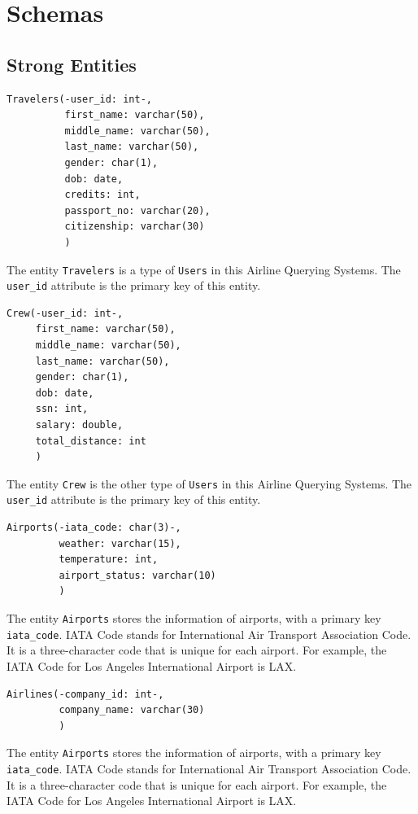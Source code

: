 \documentclass{article}
\begin{document}
	\section{Schemas}
	
	\subsection{Strong Entities}
	\begin{lstlisting}[keepspaces=true]
Travelers(-user_id: int-,
          first_name: varchar(50),
          middle_name: varchar(50),
          last_name: varchar(50),
          gender: char(1),
          dob: date,
          credits: int,
          passport_no: varchar(20), 
          citizenship: varchar(30)
          )
	\end{lstlisting}    
	The entity \texttt{Travelers} is a type of \texttt{Users} in this Airline Querying Systems. The 
	\texttt{user\_id} attribute is the primary key of this entity.
	
	\begin{lstlisting}[keepspaces=true]
Crew(-user_id: int-,
     first_name: varchar(50),
     middle_name: varchar(50),
     last_name: varchar(50),
     gender: char(1),
     dob: date,
     ssn: int, 
     salary: double, 
     total_distance: int
     )
	\end{lstlisting}    
	The entity \texttt{Crew} is the other type of \texttt{Users} in this Airline Querying Systems. The 
	\texttt{user\_id} attribute is the primary key of this entity.
	
	\begin{lstlisting}[keepspaces=true]
Airports(-iata_code: char(3)-, 
         weather: varchar(15),
         temperature: int,
         airport_status: varchar(10)
         )
	\end{lstlisting}    
	The entity \texttt{Airports} stores the information of airports, with a primary key \texttt{iata\_code}. IATA Code stands for International Air Transport Association Code. It is a three-character code that is unique for each airport. For example, the IATA Code for Los Angeles International Airport is LAX.
	
	\begin{lstlisting}[keepspaces=true]             
Airlines(-company_id: int-,
         company_name: varchar(30)
         )
	\end{lstlisting}    
	The entity \texttt{Airports} stores the information of airports, with a primary key \texttt{iata\_code}. IATA Code stands for International Air Transport Association Code. It is a three-character code that is unique for each airport. For example, the IATA Code for Los Angeles International Airport is LAX.
	
\end{document}
